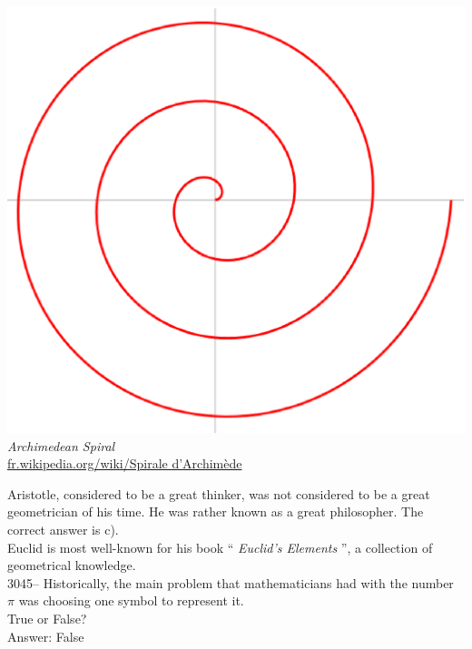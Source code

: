 \documentclass[letterpaper, 12pt]{article}
\begin{document}
\begin{center}
\includegraphics[scale=0.25]{spirale.eps}\\
\emph{{\small Archimedean Spiral}}\\
\href{http://fr.wikipedia.org/wiki/Spirale_d\%27Archim\%C3\%A8de}{fr.wikipedia.org/wiki/Spirale d'Archim\`ede}
\end{center}
Aristotle, considered to be a great thinker, was not considered to be a great geometrician of his time. He was rather known as a great philosopher. The correct answer is c).\\
Euclid is most well-known for his book `` \emph{Euclid's Elements} '', a collection of geometrical knowledge.\\



3045-- Historically, the main problem that mathematicians had with the number $\pi$ was choosing one symbol to represent it.\\
True or False?\\

Answer: False\\
\end{document}
